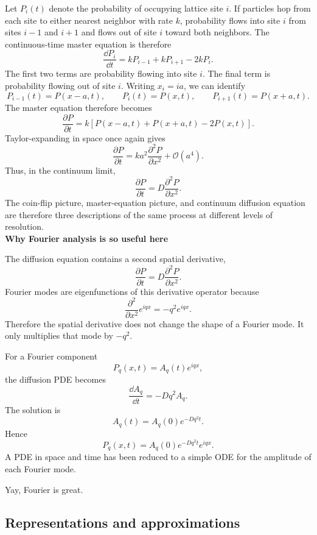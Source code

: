 Let $P_i(t)$ denote the probability of occupying lattice site $i$.
If particles hop from each site to either nearest neighbor with rate $k$, probability flows into site $i$ from sites $i-1$ and $i+1$ and flows out of site $i$ toward both neighbors.
The continuous-time master equation is therefore
% 
\[ 
    \boxed{\frac{\dd P_i}{\dd t} = kP_{i-1} + kP_{i+1} - 2kP_i.} 
\]
% 
The first two terms are probability flowing into site $i$.
The final term is probability flowing out of site $i$.
Writing $x_i=ia$, we can identify
% 
\[ 
    P_{i-1}(t)=P(x-a,t), \qquad P_i(t)=P(x,t), \qquad P_{i+1}(t)=P(x+a,t). 
\]
% 
The master equation therefore becomes
% 
\[ 
    \frac{\partial P}{\partial t} = k\left[P(x-a,t)+P(x+a,t)-2P(x,t)\right]. 
\]
% 
Taylor-expanding in space once again gives
% 
\[ 
    \frac{\partial P}{\partial t} = ka^2\frac{\partial^2P}{\partial x^2} + \mathcal{O}(a^4). 
\]
% 
Thus, in the continuum limit,
% 
\[ 
    \boxed{\frac{\partial P}{\partial t} = D\frac{\partial^2P}{\partial x^2}.} 
\]
% 
The coin-flip picture, master-equation picture, and continuum diffusion equation are therefore three descriptions of the same process at different levels of resolution.
% 
% 
\medskip
\\
\textbf{Why Fourier analysis is so useful here}

The diffusion equation contains a second spatial derivative,
% 
\[ 
    \frac{\partial P}{\partial t} = D\frac{\partial^2P}{\partial x^2}. 
\]
% 
Fourier modes are eigenfunctions of this derivative operator because
% 
\[ 
    \frac{\partial^2}{\partial x^2}e^{iqx} = -q^2e^{iqx}. 
\]
% 
Therefore the spatial derivative does not change the shape of a Fourier mode.
It only multiplies that mode by $-q^2$.

For a Fourier component
% 
\[ 
    P_q(x,t)=A_q(t)e^{iqx}, 
\]
% 
the diffusion PDE becomes
% 
\[ 
    \frac{\dd A_q}{\dd t} = -Dq^2A_q. 
\]
% 
The solution is
% 
\[ 
    A_q(t)=A_q(0)e^{-Dq^2t}. 
\]
% 
Hence
% 
\[ 
    \boxed{P_q(x,t)=A_q(0)e^{-Dq^2t}e^{iqx}.} 
\]
% 
A PDE in space and time has been reduced to a simple ODE for the amplitude of each Fourier mode.

Yay, Fourier is great.

\subsection{Representations and approximations}

